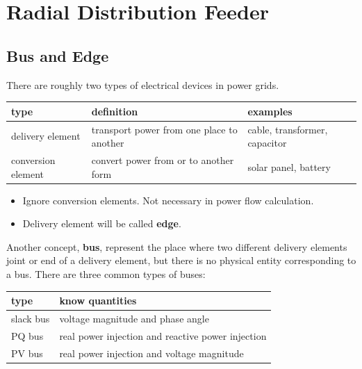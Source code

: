 \documentclass[
]{book}
\providecommand{\tightlist}{%
  \setlength{\itemsep}{0pt}\setlength{\parskip}{0pt}}
\begin{document}
\hypertarget{radial-distribution-feeder}{%
\chapter{Radial Distribution Feeder}\label{radial-distribution-feeder}}

\hypertarget{bus-edge}{%
\section{Bus and Edge}\label{bus-edge}}

There are roughly two types of electrical devices in power grids.

\begin{table}[H]
\centering
\begin{tabular}[t]{l|l|l}
\hline
type & definition & examples\\
\hline
delivery element & transport power from one place to another & cable, transformer, capacitor\\
\hline
conversion element & convert power from or to another form & solar panel, battery\\
\hline
\end{tabular}
\end{table}

\begin{itemize}
\tightlist
\item
  Ignore conversion elements. Not necessary in power flow calculation.
\item
  Delivery element will be called \textbf{edge}.
\end{itemize}

Another concept, \textbf{bus}, represent the place where two different delivery
elements joint or end of a delivery element, but there is no physical entity
corresponding to a bus. There are three common types of buses:

\begin{table}[H]
\centering
\begin{tabular}[t]{l|l}
\hline
type & know quantities\\
\hline
slack bus & voltage magnitude and phase angle\\
\hline
PQ bus & real power injection and reactive power injection\\
\hline
PV bus & real power injection and voltage magnitude\\
\hline
\end{tabular}
\end{table}
\end{document}
